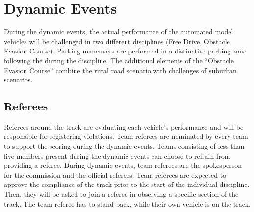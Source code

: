 \chapter{Dynamic Events}

During the dynamic events, the actual performance of the automated model
vehicles will be challenged in two different disciplines (Free Drive, Obstacle 
Evasion Course). Parking maneuvers are performed in a distinctive parking zone 
following the  during the 
discipline. The additional elements of the “Obstacle Evasion Course” combine
the rural road scenario with challenges of suburban scenarios.

\section{Referees}

Referees around the track are evaluating each vehicle’s performance and will be
responsible for registering violations. Team referees are nominated by every
team to support the scoring during the dynamic events. Teams consisting of less
than five members present during the dynamic events can choose to refrain from
providing a referee. During dynamic events, team referees are the spokesperson
for the commission and the official referees. Team referees are expected to
approve the compliance of the track prior to the start of the individual
discipline. Then, they will be asked to join a referee in observing a specific
section of the track. The team referee has to stand back, while their own
vehicle is on the track.



